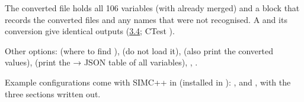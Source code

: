 The converted file holds all 106 variables (with \hyperref[param:extrau5fdbaseu5ffile]{} already merged) and a  block that records
the converted files and any names that were not recognised. A  and its conversion give identical outputs
(\hyperref[user_manual-03u5fquicku5fstart:34-the-same-run-from-json]{3.4}; CTest ).

Other  options:  (where to find \hyperref[param:extrau5fdbaseu5ffile]{}),  (do not load it),
 (also print the converted values),  (print the  → JSON table of all variables), ,
.

Example configurations come with SIMC++ in  (installed in ):
,  and , with the three sections written out.

